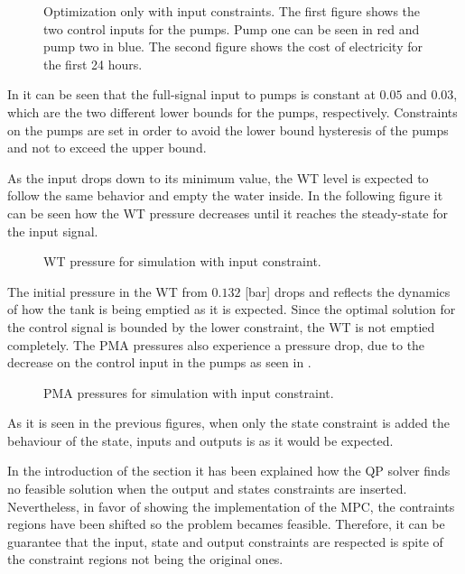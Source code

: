 \begin{figure}[H]
\centering
 
\caption{Optimization only with input constraints. The first figure shows the two control inputs for the pumps. Pump one can be seen in red and pump two in blue. The second figure shows the cost of electricity for the first 24 hours.}
\label{fig:Implementation_shit}
\end{figure}

In  it can be seen that the full-signal input to pumps is constant at $0.05$ and $0.03$, which are the two different lower bounds for the pumps, respectively. Constraints on the pumps are set in order to avoid the lower bound hysteresis of the pumps and not to exceed the upper bound. 

As the input drops down to its minimum value, the WT level is expected to follow the same behavior and empty the water inside. In the following figure it can be seen how the WT pressure decreases until it reaches the steady-state for the input signal.

\begin{figure}[H]
\centering
 
\caption{WT pressure for simulation with input constraint.}
\label{fig:WT_input}
\end{figure}

The initial pressure in the WT from $0.132$ [bar] drops and reflects the dynamics of how the tank is being emptied as it is expected. Since the optimal solution for the control signal is bounded by the lower constraint, the WT is not emptied completely.   
The PMA pressures also experience a pressure drop, due to the decrease on the control input in the pumps as seen in .

\begin{figure}[H]
\centering
 
\caption{PMA pressures for simulation with input constraint.}
\label{fig:Output_input}
\end{figure}

As it is seen in the previous figures, when only the state constraint is added the behaviour of the state, inputs and outputs is as it would be expected. 

In the introduction of the section it has been explained how the QP solver finds no feasible solution when the output and states constraints are inserted. Nevertheless, in favor of showing the implementation of the MPC, the contraints regions have been shifted so the problem becames feasible. Therefore, it can be guarantee that the input, state and output constraints are respected is spite of the constraint regions not being the original ones. 

